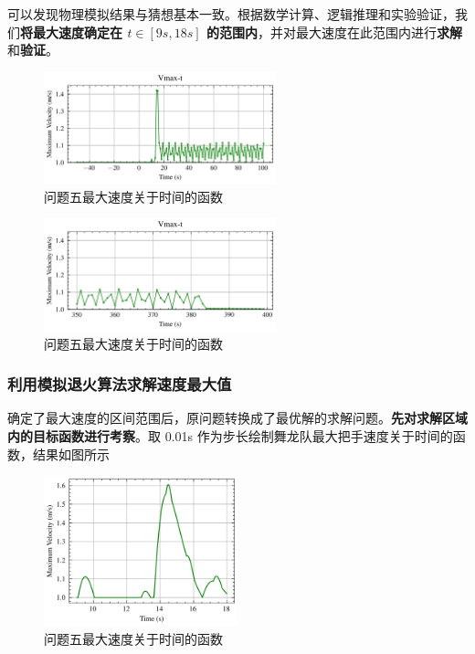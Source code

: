\documentclass[a4paper]{article}
\begin{document}
		可以发现物理模拟结果与猜想基本一致。根据数学计算、逻辑推理和实验验证，我们\textbf{将最大速度确定在 $t \in [9s,18s]$ 的范围内}，并对最大速度在此范围内进行\textbf{求解}和\textbf{验证}。
		
		\begin{figure}[H]
			\centering
			\includegraphics[width=0.6\textwidth]{image/Figure_5511.png}
			\caption{问题五最大速度关于时间的函数}
			\label{Figure_5511}
		\end{figure}
	
		\begin{figure}[H]
			\centering
			\includegraphics[width=0.6\textwidth]{image/Figure_5512.png}
			\caption{问题五最大速度关于时间的函数}
			\label{Figure_5512}
		\end{figure}
		
	\subsubsection{利用模拟退火算法求解速度最大值}
	
		确定了最大速度的区间范围后，原问题转换成了最优解的求解问题。\textbf{先对求解区域内的目标函数进行考察}。取 0.01s 作为步长绘制舞龙队最大把手速度关于时间的函数，结果如图所示
		
		\begin{figure}[H]
			\centering
			\includegraphics[width=0.5\textwidth]{image/Figure_5514.png}
			\caption{问题五最大速度关于时间的函数}
			\label{Figure_5514}
		\end{figure}
		
\end{document}
